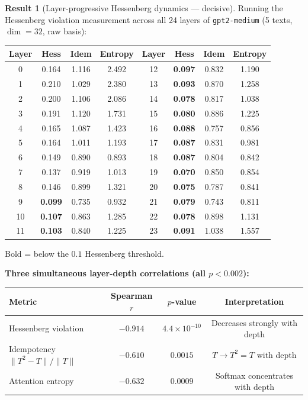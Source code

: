 \documentclass[11pt]{amsart}
\theoremstyle{definition}
\newtheorem{result}[theorem]{Result}
\begin{document}
\begin{result}[Layer-progressive Hessenberg dynamics — decisive]
\label{result:sweep}
Running the Hessenberg violation measurement across all 24 layers of
\texttt{gpt2-medium} (5 texts, $\dim=32$, raw basis):

\begin{center}
\renewcommand{\arraystretch}{1.1}
\small
\begin{tabular}{@{}cccc|cccc@{}}
\toprule
Layer & Hess & Idem & Entropy & Layer & Hess & Idem & Entropy \\
\midrule
0  & 0.164 & 1.116 & 2.492 & 12 & \textbf{0.097} & 0.832 & 1.190 \\
1  & 0.210 & 1.029 & 2.380 & 13 & \textbf{0.093} & 0.870 & 1.258 \\
2  & 0.200 & 1.106 & 2.086 & 14 & \textbf{0.078} & 0.817 & 1.038 \\
3  & 0.191 & 1.120 & 1.731 & 15 & \textbf{0.080} & 0.886 & 1.225 \\
4  & 0.165 & 1.087 & 1.423 & 16 & \textbf{0.088} & 0.757 & 0.856 \\
5  & 0.164 & 1.011 & 1.193 & 17 & \textbf{0.087} & 0.831 & 0.981 \\
6  & 0.149 & 0.890 & 0.893 & 18 & \textbf{0.087} & 0.804 & 0.842 \\
7  & 0.137 & 0.919 & 1.013 & 19 & \textbf{0.070} & 0.850 & 0.854 \\
8  & 0.146 & 0.899 & 1.321 & 20 & \textbf{0.075} & 0.787 & 0.841 \\
9  & \textbf{0.099} & 0.735 & 0.932 & 21 & \textbf{0.079} & 0.743 & 0.811 \\
10 & \textbf{0.107} & 0.863 & 1.285 & 22 & \textbf{0.078} & 0.898 & 1.131 \\
11 & \textbf{0.103} & 0.840 & 1.225 & 23 & \textbf{0.091} & 1.038 & 1.557 \\
\bottomrule
\end{tabular}
\end{center}
\noindent Bold = below the $0.1$ Hessenberg threshold.

\noindent\textbf{Three simultaneous layer-depth correlations (all $p < 0.002$):}
\begin{center}
\begin{tabular}{@{}lccc@{}}
\toprule
Metric & Spearman $r$ & $p$-value & Interpretation \\
\midrule
Hessenberg violation & $-0.914$ & $4.4\times10^{-10}$ & Decreases strongly with depth \\
Idempotency $\|T^2-T\|/\|T\|$ & $-0.610$ & $0.0015$ & $T \to T^2 = T$ with depth \\
Attention entropy & $-0.632$ & $0.0009$ & Softmax concentrates with depth \\
\bottomrule
\end{tabular}
\end{center}


\end{result}
\end{document}
